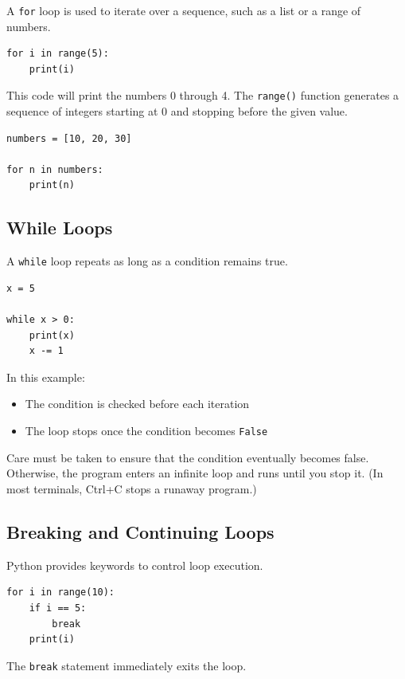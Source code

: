 A \texttt{for} loop is used to iterate over a sequence, such as a list or a range
of numbers.

\begin{verbatim}
for i in range(5):
    print(i)
\end{verbatim}

This code will print the numbers 0 through 4. The \texttt{range()} function
generates a sequence of integers starting at 0 and stopping before the given
value.

\begin{verbatim}
numbers = [10, 20, 30]

for n in numbers:
    print(n)
\end{verbatim}

\subsection{While Loops}
A \texttt{while} loop repeats as long as a condition remains true.

\begin{verbatim}
x = 5

while x > 0:
    print(x)
    x -= 1
\end{verbatim}

In this example:
\begin{itemize}
    \item The condition is checked before each iteration
    \item The loop stops once the condition becomes \texttt{False}
\end{itemize}

Care must be taken to ensure that the condition eventually becomes false.
Otherwise, the program enters an infinite loop and runs until you stop it. (In most terminals, Ctrl+C stops a runaway program.) 

\subsection{Breaking and Continuing Loops}
Python provides keywords to control loop execution.

\begin{verbatim}
for i in range(10):
    if i == 5:
        break
    print(i)
\end{verbatim}

The \texttt{break} statement immediately exits the loop.

